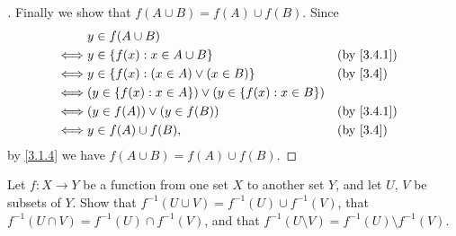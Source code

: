 \begin{proof}[]
  Finally we show that \(f(A \cup B) = f(A) \cup f(B)\).
  Since
  \begin{align*}
         & y \in f(A \cup B)                                                                    \\
    \iff & y \in \set{f(x) : x \in A \cup B}                                    &  & \by{3.4.1} \\
    \iff & y \in \set{f(x) : (x \in A) \lor (x \in B)}                          &  & \by{3.4}   \\
    \iff & \pa{y \in \set{f(x) : x \in A}} \lor \pa{y \in \set{f(x) : x \in B}}                 \\
    \iff & (y \in f(A)) \lor (y \in f(B))                                       &  & \by{3.4.1} \\
    \iff & y \in f(A) \cup f(B),                                                &  & \by{3.4}
  \end{align*}
  by \cref{3.1.4} we have \(f(A \cup B) = f(A) \cup f(B)\).
\end{proof}

\begin{ex}\label{ex:3.4.4}
  Let \(f : X \to Y\) be a function from one set \(X\) to another set \(Y\), and let \(U\), \(V\) be subsets of \(Y\). Show that \(f^{-1}(U \cup V) = f^{-1}(U) \cup f^{-1}(V)\), that
  \(f^{-1}(U \cap V) = f^{-1}(U) \cap f^{-1}(V)\), and that \(f^{-1}(U \setminus V) = f^{-1}(U) \setminus f^{-1}(V)\).
\end{ex}

